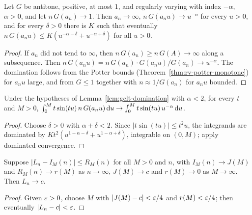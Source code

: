 \begin{lemma}
  \label{lem:gclt-domination}
  \leanok
  Let $G$ be antitone, positive, at most $1$, and regularly varying with index $-\alpha$,
  $\alpha > 0$, and let $n \, G(a_n) \to 1$. Then $a_n \to \infty$,
  $n \, G(a_n u) \to u^{-\alpha}$ for every $u > 0$, and for every $\delta > 0$ there is $K$ such
  that eventually $n \, G(a_n u) \le K (u^{-\alpha-\delta} + u^{-\alpha+\delta})$ for all
  $u > 0$.
\end{lemma}
\begin{proof}
  \leanok
  If $a_n$ did not tend to $\infty$, then $n \, G(a_n) \ge n \, G(A) \to \infty$ along a
  subsequence. Then $n \, G(a_n u) = n \, G(a_n) \cdot G(a_n u)/G(a_n) \to u^{-\alpha}$. The
  domination follows from the Potter bounds (Theorem~\ref{thm:rv-potter-monotone}) for
  $a_n u$ large, and from $G \le 1$ together with $n \approx 1/G(a_n)$ for $a_n u$ bounded.
\end{proof}

\begin{lemma}
  \label{lem:gclt-dominated}
  \leanok
  Under the hypotheses of Lemma~\ref{lem:gclt-domination} with $\alpha < 2$, for every $t$ and
  $M > 0$,
  $\int_0^M t \sin(tu) \, n \, G(a_n u) \, \mathrm{d} u \to \int_0^M t \sin(tu) \, u^{-\alpha} \, \mathrm{d} u$.
\end{lemma}
\begin{proof}
  \leanok
  Choose $\delta > 0$ with $\alpha + \delta < 2$. Since $|t \sin(tu)| \le t^2 u$, the integrands
  are dominated by $K t^2 (u^{1-\alpha-\delta} + u^{1-\alpha+\delta})$, integrable on $(0, M)$;
  apply dominated convergence.
\end{proof}

\begin{lemma}
  \label{lem:gclt-approx}
  \leanok
  Suppose $|L_n - I_M(n)| \le R_M(n)$ for all $M > 0$ and $n$, with $I_M(n) \to J(M)$ and
  $R_M(n) \to r(M)$ as $n \to \infty$, $J(M) \to c$ and $r(M) \to 0$ as $M \to \infty$. Then
  $L_n \to c$.
\end{lemma}
\begin{proof}
  \leanok
  Given $\varepsilon > 0$, choose $M$ with $|J(M) - c| < \varepsilon/4$ and $r(M) < \varepsilon/4$; then eventually
  $|L_n - c| < \varepsilon$.
\end{proof}

